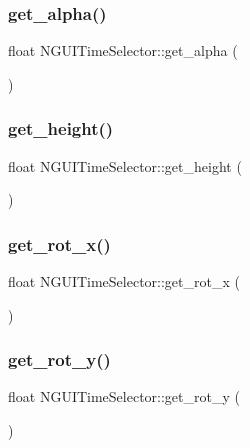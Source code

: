 \subsubsection{\texorpdfstring{get\+\_\+alpha()}{get\_alpha()}}
{\footnotesize\ttfamily float N\+G\+U\+I\+Time\+Selector\+::get\+\_\+alpha (\begin{DoxyParamCaption}{ }\end{DoxyParamCaption})}

\hypertarget{class_n_g_u_i_time_selector_a21387301137356af2ef24cfa7d102bf8}{}\label{class_n_g_u_i_time_selector_a21387301137356af2ef24cfa7d102bf8} 
\subsubsection{\texorpdfstring{get\+\_\+height()}{get\_height()}}
{\footnotesize\ttfamily float N\+G\+U\+I\+Time\+Selector\+::get\+\_\+height (\begin{DoxyParamCaption}{ }\end{DoxyParamCaption})}

\hypertarget{class_n_g_u_i_time_selector_ad70c611ed6f8453f8be6e8c1805bb534}{}\label{class_n_g_u_i_time_selector_ad70c611ed6f8453f8be6e8c1805bb534} 
\subsubsection{\texorpdfstring{get\+\_\+rot\+\_\+x()}{get\_rot\_x()}}
{\footnotesize\ttfamily float N\+G\+U\+I\+Time\+Selector\+::get\+\_\+rot\+\_\+x (\begin{DoxyParamCaption}{ }\end{DoxyParamCaption})}

\hypertarget{class_n_g_u_i_time_selector_af8865ef3e6e0f4b155981c6b9762112d}{}\label{class_n_g_u_i_time_selector_af8865ef3e6e0f4b155981c6b9762112d} 
\subsubsection{\texorpdfstring{get\+\_\+rot\+\_\+y()}{get\_rot\_y()}}
{\footnotesize\ttfamily float N\+G\+U\+I\+Time\+Selector\+::get\+\_\+rot\+\_\+y (\begin{DoxyParamCaption}{ }\end{DoxyParamCaption})}

